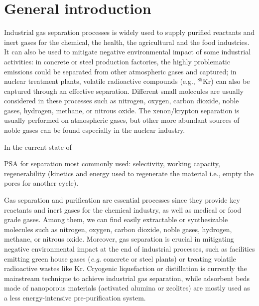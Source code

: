 
\chapter*{General introduction}


Industrial gas separation processes is widely used to supply purified reactants and inert gases for the chemical, the health, the agricultural and the food industries. It can also be used to mitigate negative environmental impact of some industrial activities: in concrete or steel production factories, the highly problematic  emissions could be separated from other atmospheric gases and captured; in nuclear treatment plants, volatile radioactive compounds (e.g., $^{85}$Kr) can also be captured through an effective separation. Different small molecules are usually considered in these processes such as nitrogen, oxygen, carbon
dioxide, noble gases, hydrogen, methane, or nitrous oxide. The xenon/krypton separation is usually performed on atmospheric gases,\autocite{kerry2007industrial} but other more abundant sources of noble gases can be found especially in the nuclear industry.\autocite{Banerjee_2014} 


In the current state of 



PSA for separation most commonly used: selectivity, working capacity, regenerability (kinetics and energy used to regenerate the material i.e., empty the pores for another cycle).\autocite{Kumar_1994}





Gas separation and purification are essential processes since they provide key reactants and inert gases for the chemical industry, as well as medical or food grade gases. Among them, we can find easily extractable or synthesizable molecules such as nitrogen, oxygen, carbon dioxide, noble gases, hydrogen, methane, or nitrous oxide. Moreover, gas separation is crucial in mitigating negative environmental impact at the end of industrial processes, such as facilities emitting green house gases (\emph{e.g.} concrete or steel plants) or treating volatile radioactive wastes like Kr. Cryogenic liquefaction or distillation is currently the mainstream technique to achieve industrial gas separation, while adsorbent beds made of nanoporous materials (activated alumina or zeolites) are mostly used as a less energy-intensive pre-purification system.\autocite{kerry2007industrial}

